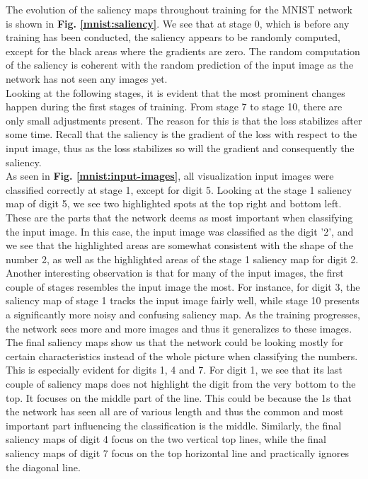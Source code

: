 The evolution of the saliency maps throughout training for the MNIST network is shown in \textbf{Fig. \ref{mnist:saliency}}. We see that at stage 0, which is before any training has been conducted, the saliency appears to be randomly computed, except for the black areas where the gradients are zero. The random computation of the saliency is coherent with the random prediction of the input image as the network has not seen any images yet.\\

\noindent Looking at the following stages, it is evident that the most prominent changes happen during the first stages of training. From stage 7 to stage 10, there are only small adjustments present. The reason for this is that the loss stabilizes after some time. Recall that the saliency is the gradient of the loss with respect to the input image, thus as the loss stabilizes so will the gradient and consequently the saliency. \\

\noindent As seen in \textbf{Fig. \ref{mnist:input-images}}, all visualization input images were classified correctly at stage 1, except for digit 5. Looking at the stage 1 saliency map of digit 5, we see two highlighted spots at the top right and bottom left. These are the parts that the network deems as most important when classifying the input image. In this case, the input image was classified as the digit '2', and we see that the highlighted areas are somewhat consistent with the shape of the number 2, as well as the highlighted areas of the stage 1 saliency map for digit 2. \\


\noindent Another interesting observation is that for many of the input images, the first couple of stages resembles the input image the most. For instance, for digit 3, the saliency map of stage 1 tracks the input image fairly well, while stage 10 presents a significantly more noisy and confusing saliency map. As the training progresses, the network sees more and more images and thus it generalizes to these images. The final saliency maps show us that the network could be looking mostly for certain characteristics instead of the whole picture when classifying the numbers. This is especially evident for digits 1, 4 and 7. For digit 1, we see that its last couple of saliency maps does not highlight the digit from the very bottom to the top. It focuses on the middle part of the line. This could be because the 1s that the network has seen all are of various length and thus the common and most important part influencing the classification is the middle. Similarly, the final saliency maps of digit 4 focus on the two vertical top lines, while the final saliency maps of digit 7 focus on the top horizontal line and practically ignores the diagonal line. \\

